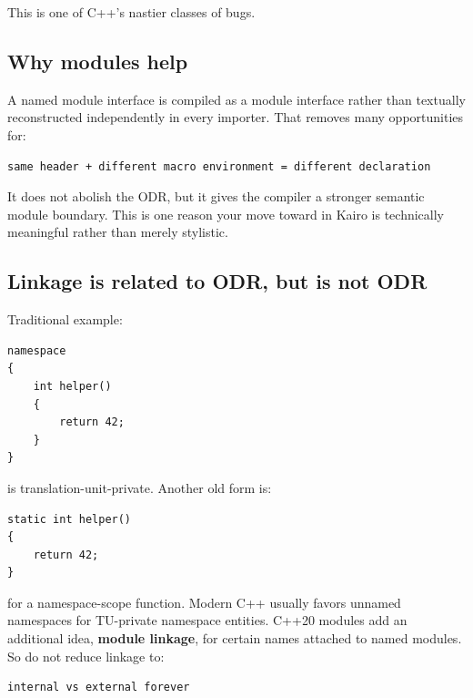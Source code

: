 This is one of C++'s nastier classes of bugs.

\subsection{Why modules help}\label{05-engine-i-ch002-why-modules-help}

\hypertarget{05-engine-i-ch002-why-modules-help}{}

A named module interface is compiled as a module interface rather than textually reconstructed independently in every importer. That removes many opportunities for:

\begin{verbatim}
same header + different macro environment = different declaration
\end{verbatim}

It does not abolish the ODR, but it gives the compiler a stronger semantic module boundary. This is one reason your move toward  in Kairo is technically meaningful rather than merely stylistic.

\subsection{Linkage is related to ODR, but is not ODR}\label{05-engine-i-ch002-linkage-is-related-to-odr-but-is-not-odr}

\hypertarget{05-engine-i-ch002-linkage-is-related-to-odr-but-is-not-odr}{}

Traditional example:

\begin{verbatim}
namespace
{
    int helper()
    {
        return 42;
    }
}
\end{verbatim}

 is translation-unit-private. Another old form is:

\begin{verbatim}
static int helper()
{
    return 42;
}
\end{verbatim}

for a namespace-scope function. Modern C++ usually favors unnamed namespaces for TU-private namespace entities. C++20 modules add an additional idea, \textbf{module linkage}, for certain names attached to named modules. So do not reduce linkage to:

\begin{verbatim}
internal vs external forever
\end{verbatim}

